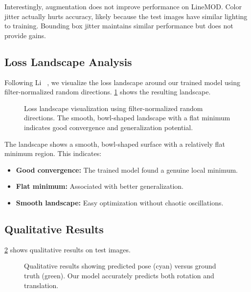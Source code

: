Interestingly, augmentation does not improve performance on LineMOD. Color jitter actually hurts accuracy, likely because the test images have similar lighting to training. Bounding box jitter maintains similar performance but does not provide gains.

\subsection{Loss Landscape Analysis}

Following Li \etal~\cite{visualloss}, we visualize the loss landscape around our trained model using filter-normalized random directions. \cref{fig:loss_landscape} shows the resulting landscape.

\begin{figure}[h]
\centering
{}
\caption{Loss landscape visualization using filter-normalized random directions. The smooth, bowl-shaped landscape with a flat minimum indicates good convergence and generalization potential.}
\label{fig:loss_landscape}
\end{figure}

The landscape shows a smooth, bowl-shaped surface with a relatively flat minimum region. This indicates:
\begin{itemize}
    \item \textbf{Good convergence:} The trained model found a genuine local minimum.
    \item \textbf{Flat minimum:} Associated with better generalization.
    \item \textbf{Smooth landscape:} Easy optimization without chaotic oscillations.
\end{itemize}

\subsection{Qualitative Results}

\cref{fig:qualitative} shows qualitative results on test images.

\begin{figure}[h]
\centering
{}
\caption{Qualitative results showing predicted pose (cyan) versus ground truth (green). Our model accurately predicts both rotation and translation.}
\label{fig:qualitative}
\end{figure}


